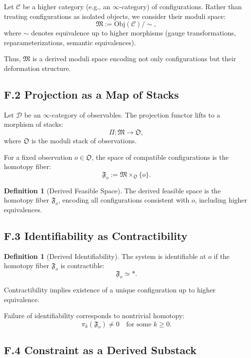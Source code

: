 \documentclass[12pt, oneside]{article}
\theoremstyle{plain}
\theoremstyle{definition}
\newtheorem{definition}[theorem]{Definition}
\theoremstyle{remark}
\begin{document}
Let $\mathcal{C}$ be a higher category (e.g., an $\infty$-category) of configurations. Rather than treating configurations as isolated objects, we consider their moduli space:
\[
\mathfrak{M} := \mathrm{Obj}(\mathcal{C}) / \sim,
\]
where $\sim$ denotes equivalence up to higher morphisms (gauge transformations, reparameterizations, semantic equivalences).

Thus, $\mathfrak{M}$ is a derived moduli space encoding not only configurations but their deformation structure.

\subsection{F.2 Projection as a Map of Stacks}

Let $\mathcal{D}$ be an $\infty$-category of observables. The projection functor lifts to a morphism of stacks:
\[
\Pi : \mathfrak{M} \to \mathfrak{O},
\]
where $\mathfrak{O}$ is the moduli stack of observations.

For a fixed observation $o \in \mathfrak{O}$, the space of compatible configurations is the homotopy fiber:
\[
\mathfrak{F}_o := \mathfrak{M} \times_{\mathfrak{O}} \{o\}.
\]

\begin{definition}[Derived Feasible Space]
The derived feasible space is the homotopy fiber $\mathfrak{F}_o$, encoding all configurations consistent with $o$, including higher equivalences.
\end{definition}

\subsection{F.3 Identifiability as Contractibility}

\begin{definition}[Derived Identifiability]
The system is identifiable at $o$ if the homotopy fiber $\mathfrak{F}_o$ is contractible:
\[
\mathfrak{F}_o \simeq *.
\]
\end{definition}

Contractibility implies existence of a unique configuration up to higher equivalence.

Failure of identifiability corresponds to nontrivial homotopy:
\[
\pi_k(\mathfrak{F}_o) \neq 0 \quad \text{for some } k \ge 0.
\]

\subsection{F.4 Constraint as a Derived Substack}
\end{document}
